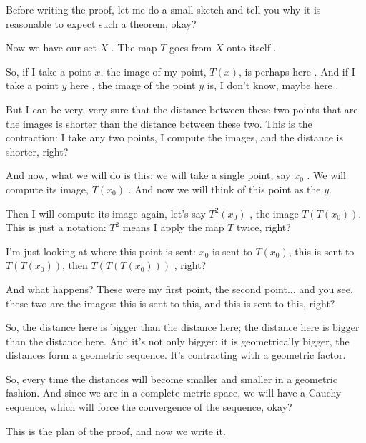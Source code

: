 \begin{speech}[00:21:58 - 00:23:28]
Before writing the proof, let me do a small sketch and tell you why it is reasonable to expect such a theorem, okay?

Now we have our set $X$ . The map $T$ goes from $X$ onto itself .

So, if I take a point $x$, the image of my point, $T(x)$, is perhaps here . And if I take a point $y$ here , the image of the point $y$ is, I don't know, maybe here .

But I can be very, very sure that the distance between these two points that are the images is shorter than the distance between these two. This is the contraction: I take any two points, I compute the images, and the distance is shorter, right?
\end{speech}

\begin{speech}[00:23:28 - 00:25:05]
And now, what we will do is this: we will take a single point, say $x_0$ . We will compute its image, $T(x_0)$ . And now we will think of this point as the $y$.

Then I will compute its image again, let's say $T^2(x_0)$ , the image $T(T(x_0))$. This is just a notation: $T^2$ means I apply the map $T$ twice, right?

I'm just looking at where this point is sent: $x_0$ is sent to $T(x_0)$, this is sent to $T(T(x_0))$, then $T(T(T(x_0)))$ , right?

And what happens? These were my first point, the second point... and you see, these two are the images: this is sent to this, and this is sent to this, right?

So, the distance here is bigger than the distance here; the distance here is bigger than the distance here. And it's not only bigger: it is geometrically bigger, the distances form a geometric sequence. It's contracting with a geometric factor.

So, every time the distances will become smaller and smaller in a geometric fashion. And since we are in a complete metric space, we will have a Cauchy sequence, which will force the convergence of the sequence, okay?

This is the plan of the proof, and now we write it.
\end{speech}

